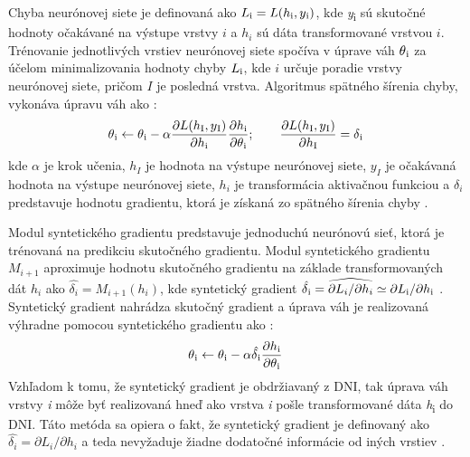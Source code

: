 Chyba neurónovej siete je definovaná ako $L\textsubscript{i}=L(h\textsubscript{i},y\textsubscript{i})$, kde \textit{y}\textsubscript{i} sú skutočné hodnoty očakávané na výstupe vrstvy $i$ a $h_i$ sú dáta transformované vrstvou $i$. Trénovanie jednotlivých vrstiev neurónovej siete spočíva v úprave váh $\theta\textsubscript{i}$ za účelom minimalizovania hodnoty chyby $L\textsubscript{i}$, kde $i$ určuje poradie vrstvy neurónovej siete, pričom $I$ je posledná vrstva. Algoritmus spätného šírenia chyby, vykonáva úpravu váh ako \cite{Jaderberg2016, Goh1995}:
\begin{equation}
    \theta\textsubscript{i} \leftarrow \theta\textsubscript{i} - \alpha \frac{\partial L (h\textsubscript{I},y\textsubscript{I})}{\partial h \textsubscript{i}}\frac{\partial h \textsubscript{i}}{\partial \theta \textsubscript{i}} ;\qquad \frac{\partial L(h\textsubscript{I},y\textsubscript{I})}{\partial h \textsubscript{I}} = \delta\textsubscript{i}
\end{equation}
kde $\alpha$ je krok učenia, $h_I$ je hodnota na výstupe neurónovej siete, $y_I$ je očakávaná hodnota na výstupe neurónovej siete, $h_i$ je transformácia aktivačnou funkciou a $\delta_i$ predstavuje hodnotu gradientu, ktorá je získaná zo spätného šírenia chyby \cite{Czarnecki2017, Goh1995, Jaderberg2016}.

 
 Modul syntetického gradientu predstavuje jednoduchú neurónovú sieť, ktorá je trénovaná na predikciu skutočného gradientu. Modul syntetického gradientu $M_{i+1}$ aproximuje hodnotu skutočného gradientu na základe transformovaných dát $h_i$ ako $\hat{\delta_i}=M_{i+1}(h_i)$, kde syntetický gradient $\hat{\delta\textsubscript{i}} = \widehat{\partial L_i/\partial h_i}\simeq\partial L\textsubscript{i}/\partial h \textsubscript{i}$ \cite{Czarnecki2017}. Syntetický gradient nahrádza skutočný gradient a úprava váh je realizovaná výhradne pomocou syntetického gradientu ako \cite{Jaderberg2016}:
\begin{equation}
    \theta\textsubscript{i} \leftarrow \theta\textsubscript{i} - \alpha \hat{\delta\textsubscript{i}}\frac{\partial h \textsubscript{i}}{\partial \theta \textsubscript{i}}
\end{equation}
Vzhľadom k tomu, že syntetický gradient je obdržiavaný z DNI, tak úprava váh vrstvy \textit{i} môže byť realizovaná hneď ako vrstva \textit{i} pošle transformované dáta \textit{h}\textsubscript{i} do DNI. Táto metóda sa opiera o fakt, že syntetický gradient je definovaný ako $\hat{\delta_i} = \partial L_i / \partial h_i$ a teda nevyžaduje žiadne dodatočné informácie od iných vrstiev \cite{Czarnecki2017}.

